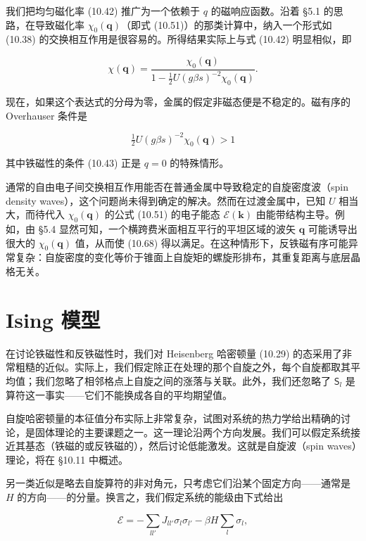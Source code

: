 我们把均匀磁化率 (10.42) 推广为一个依赖于 $q$ 的磁响应函数。沿着 §5.1 的思路，在导致磁化率 $\chi_0(\mathbf{q})$（即式 (10.51)）的那类计算中，纳入一个形式如 (10.38) 的交换相互作用是很容易的。所得结果实际上与式 (10.42) 明显相似，即

\begin{equation*}
\chi(\mathbf{q}) = \frac{\chi_0(\mathbf{q})}{1 - \tfrac{1}{2} U (g\beta s)^{-2} \chi_0(\mathbf{q})}.
\tag{10.67}
\end{equation*}

现在，如果这个表达式的分母为零，金属的假定非磁态便是不稳定的。磁有序的 Overhauser 条件是

\begin{equation*}
\tfrac{1}{2} U (g\beta s)^{-2} \chi_0(\mathbf{q}) > 1
\tag{10.68}
\end{equation*}

其中铁磁性的条件 (10.43) 正是 $q = 0$ 的特殊情形。

通常的自由电子间交换相互作用能否在普通金属中导致稳定的自旋密度波（spin density waves），这个问题尚未得到确定的解决。然而在过渡金属中，已知 $U$ 相当大，而待代入 $\chi_0(\mathbf{q})$ 的公式 (10.51) 的电子能态 $\mathcal{E}(\mathbf{k})$ 由能带结构主导。例如，由 §5.4 显然可知，一个横跨费米面相互平行的平坦区域的波矢 $\mathbf{q}$ 可能诱导出很大的 $\chi_0(\mathbf{q})$ 值，从而使 (10.68) 得以满足。在这种情形下，反铁磁有序可能异常复杂：自旋密度的变化等价于锥面上自旋矩的螺旋形排布，其重复距离与底层晶格无关。

\section{Ising 模型}

在讨论铁磁性和反铁磁性时，我们对 Heisenberg 哈密顿量 (10.29) 的态采用了非常粗糙的近似。实际上，我们假定除正在处理的那个自旋之外，每个自旋都取其平均值；我们忽略了相邻格点上自旋之间的涨落与关联。此外，我们还忽略了 $\mathsf{S}_l$ 是算符这一事实——它们不能换成各自的平均期望值。

自旋哈密顿量的本征值分布实际上非常复杂，试图对系统的热力学给出精确的讨论，是固体理论的主要课题之一。这一理论沿两个方向发展。我们可以假定系统接近其基态（铁磁的或反铁磁的），然后讨论低能激发。这就是自旋波（spin waves）理论，将在 §10.11 中概述。

另一类近似是略去自旋算符的非对角元，只考虑它们沿某个固定方向——通常是 $H$ 的方向——的分量。换言之，我们假定系统的能级由下式给出

\begin{equation*}
\mathcal{E} = -\sum_{ll'} J_{ll'} \sigma_l \sigma_{l'} - \beta H \sum_l \sigma_l,
\tag{10.69}
\end{equation*}

